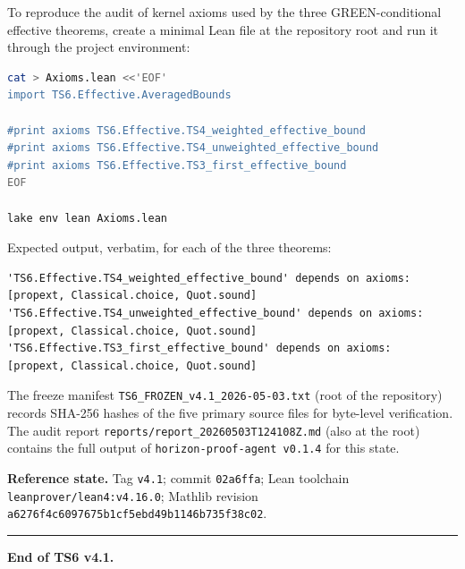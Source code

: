 \documentclass[11pt,a4paper]{article}
\theoremstyle{definition}
\begin{document}
To reproduce the audit of kernel axioms used by the three GREEN-conditional effective theorems, create a minimal Lean file at the repository root and run it through the project environment:

\begin{lstlisting}[language=bash]
cat > Axioms.lean <<'EOF'
import TS6.Effective.AveragedBounds

#print axioms TS6.Effective.TS4_weighted_effective_bound
#print axioms TS6.Effective.TS4_unweighted_effective_bound
#print axioms TS6.Effective.TS3_first_effective_bound
EOF

lake env lean Axioms.lean
\end{lstlisting}

Expected output, verbatim, for each of the three theorems:

\begin{lstlisting}[language={}]
'TS6.Effective.TS4_weighted_effective_bound' depends on axioms:
[propext, Classical.choice, Quot.sound]
'TS6.Effective.TS4_unweighted_effective_bound' depends on axioms:
[propext, Classical.choice, Quot.sound]
'TS6.Effective.TS3_first_effective_bound' depends on axioms:
[propext, Classical.choice, Quot.sound]
\end{lstlisting}

The freeze manifest \texttt{TS6\_FROZEN\_v4.1\_2026-05-03.txt} (root of the repository) records SHA-256 hashes of the five primary source files for byte-level verification. The audit report \texttt{reports/report\_20260503T124108Z.md} (also at the root) contains the full output of \texttt{horizon-proof-agent v0.1.4} for this state.

\medskip

\noindent\textbf{Reference state.} Tag \texttt{v4.1}; commit \texttt{02a6ffa}; Lean toolchain \texttt{leanprover/lean4:v4.16.0}; Mathlib revision \texttt{a6276f4c6097675b1cf5ebd49b1146b735f38c02}.

\bigskip
\hrule
\bigskip

\noindent\textbf{End of TS6 v4.1.}
\end{document}
